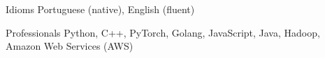 
\begin{cvskills}
	\cvskill
	{Idioms}
	{Portuguese (native), English (fluent)}

	\cvskill
	{Professionals}
	{Python, C++, PyTorch, Golang, JavaScript, Java, Hadoop, Amazon Web Services (AWS)}

\end{cvskills}
